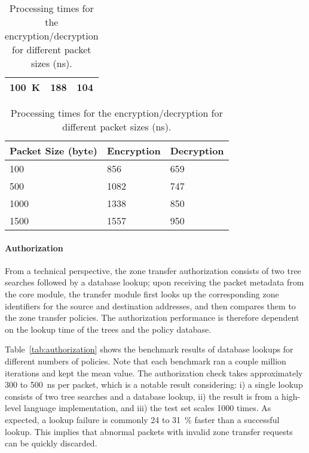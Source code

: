 \begin{table}[htb]
\begin{minipage}{.47\linewidth}
\begin{tabularx}{1\linewidth}{X|XX}
			\SI{100}{K}    & 188           & 104           \\	%
			\bottomrule
		\end{tabularx}
	\end{minipage}\hspace{2em}
	\begin{minipage}{.47\linewidth}
		\caption{Processing times for the encryption/decryption for different packet sizes (ns).}
		\label{tab:authentication}
		\begin{tabularx}{1\linewidth}{X|XX}
			\toprule
			Packet Size (byte) & Encryption & Decryption \\
			\midrule
			100                & 856        & 659        \\
			500                & 1082       & 747        \\
			1000               & 1338       & 850        \\
			1500               & 1557       & 950        \\
			\bottomrule
		\end{tabularx}
	\end{minipage}
\end{table}

\paragraph{Authorization}
From a technical perspective, the zone transfer authorization consists of two tree searches followed
by a database lookup;
upon receiving the packet metadata from the core module, the transfer module first looks
up the corresponding zone identifiers for the source and destination addresses, and then
compares them to the zone transfer policies. The authorization performance is therefore
dependent on the lookup time of the trees and the policy database.

Table~\ref{tab:authorization} shows
the benchmark results of database lookups for different numbers of policies.
Note that each benchmark ran a couple million iterations and kept the mean value.
The authorization check takes approximately 300 to \SI{500}{ns} per packet, which is a
notable result considering: i) a single lookup consists of two tree searches and a database lookup, ii) the result
is from a high-level language implementation, and iii) the test set scales 1000 times.
As expected, a lookup failure is commonly 24 to 31~\% faster than a successful lookup.
This implies that abnormal packets with invalid zone transfer requests can be quickly
discarded.


